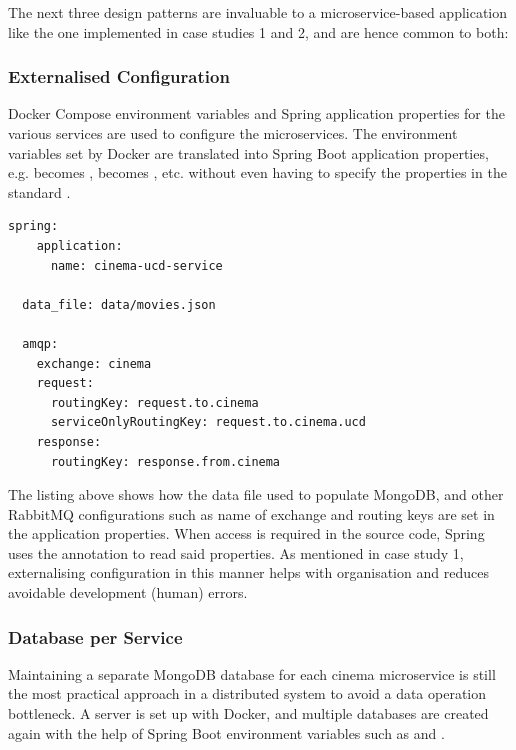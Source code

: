 The next three design patterns are invaluable to a microservice-based application like the one implemented in case studies 1 and 2, and are hence common to both:

\subsubsection{Externalised Configuration}

Docker Compose environment variables and Spring application properties for the various services are used to configure the microservices. The environment variables set by Docker are translated into Spring Boot application properties, e.g.  becomes ,  becomes , etc. without even having to specify the properties in the standard .

\begin{lstlisting}[caption=UCD cinema's \code{application.yml}]
  spring:
    application:
      name: cinema-ucd-service

  data_file: data/movies.json

  amqp:
    exchange: cinema
    request:
      routingKey: request.to.cinema
      serviceOnlyRoutingKey: request.to.cinema.ucd
    response:
      routingKey: response.from.cinema
\end{lstlisting}

The listing above shows how the data file used to populate MongoDB, and other RabbitMQ configurations such as name of exchange and routing keys are set in the application properties. When access is required in the source code, Spring uses the  annotation to read said properties. As mentioned in case study 1, externalising configuration in this manner helps with organisation and reduces avoidable development (human) errors.

\subsubsection{Database per Service}

Maintaining a separate MongoDB database for each cinema microservice is still the most practical approach in a distributed system to avoid a data operation bottleneck. A server is set up with Docker, and multiple databases are created again with the help of Spring Boot environment variables such as  and .

